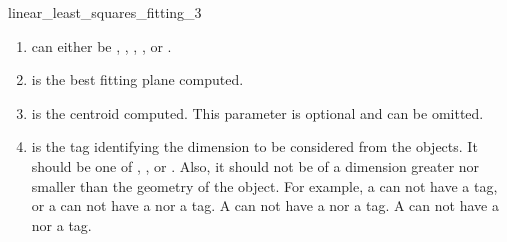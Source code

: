 \begin{ccRefFunction}{linear_least_squares_fitting_3}
\begin{enumerate}
   \item  {} can either be ,
          , , ,
           or .
   \item  {} is the best fitting plane computed.
   \item  {} is the centroid computed. This parameter is optional and can be omitted.
   \item  {} is the tag identifying the dimension to be considered from the objects. It should be one of , ,  or . Also, it should not be of a dimension greater nor smaller than the geometry of the object. For example, a  can not have a  tag, or a  can not have a  nor a  tag. A  can not have a  nor a  tag. A  can not have a  nor a  tag.
\end{enumerate}

\end{ccRefFunction}
